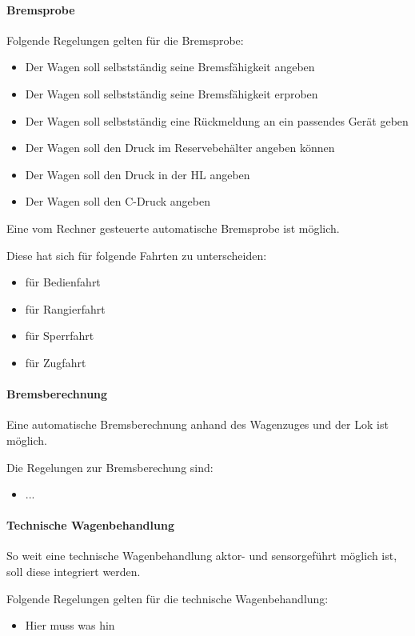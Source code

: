 \paragraph{Bremsprobe}
\begin{feat}
Folgende Regelungen gelten für die Bremsprobe:
\begin{itemize}
    \item Der Wagen soll selbstständig seine Bremsfähigkeit angeben
    \item Der Wagen soll selbstständig seine Bremsfähigkeit erproben
    \item Der Wagen soll selbstständig eine Rückmeldung an ein passendes Gerät geben
    \item Der Wagen soll den Druck im Reservebehälter angeben können
    \item Der Wagen soll den Druck in der HL angeben
    \item Der Wagen soll den C-Druck angeben
\end{itemize}
\end{feat}
\begin{feat}
Eine vom Rechner gesteuerte automatische Bremsprobe ist möglich.
\end{feat}
\begin{rem} [zu Anf. 29] 
Diese hat sich für folgende Fahrten zu unterscheiden:
\begin{itemize}
    \item für Bedienfahrt
    \item für Rangierfahrt
    \item für Sperrfahrt
    \item für Zugfahrt
\end{itemize}
\end{rem}

\paragraph{Bremsberechnung}
\begin{feat}
Eine automatische Bremsberechnung anhand des Wagenzuges und der Lok ist möglich.
\end{feat}
\begin{rem} [zu Anf. 30]
Die Regelungen zur Bremsberechung sind:
\begin{itemize}
    \item ...
\end{itemize}
\end{rem}

\paragraph{Technische Wagenbehandlung}
\begin{feat}
So weit eine technische Wagenbehandlung aktor- und sensorgeführt möglich ist, soll diese integriert werden.
\end{feat}
\begin{feat}
Folgende Regelungen gelten für die technische Wagenbehandlung:
\begin{itemize}
    \item Hier muss was hin
\end{itemize}
\end{feat}


